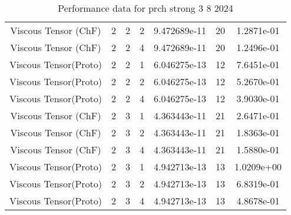 \documentclass{article}
\begin{document}
\begin{small}
\begin{table}
\begin{center}
\begin{tabular}{|c|c|c|c|c|c||c|}
        Viscous Tensor  (ChF) & 2 & 2 & 2& 9.472689e-11 & 20 & 1.2871e-01\\
        Viscous Tensor  (ChF) & 2 & 2 & 4& 9.472689e-11 & 20 & 1.2496e-01\\
        Viscous Tensor(Proto) & 2 & 2 & 1& 6.046275e-13 & 12 & 7.6451e-01\\
        Viscous Tensor(Proto) & 2 & 2 & 2& 6.046275e-13 & 12 & 5.2670e-01\\
        Viscous Tensor(Proto) & 2 & 2 & 4& 6.046275e-13 & 12 & 3.9030e-01\\
        \hline 
        Viscous Tensor  (ChF) & 2 & 3 & 1& 4.363443e-11 & 21 & 2.6471e-01\\
        Viscous Tensor  (ChF) & 2 & 3 & 2& 4.363443e-11 & 21 & 1.8363e-01\\
        Viscous Tensor  (ChF) & 2 & 3 & 4& 4.363443e-11 & 21 & 1.5880e-01\\
        Viscous Tensor(Proto) & 2 & 3 & 1& 4.942713e-13 & 13 & 1.0209e+00\\
        Viscous Tensor(Proto) & 2 & 3 & 2& 4.942713e-13 & 13 & 6.8319e-01\\
        Viscous Tensor(Proto) & 2 & 3 & 4& 4.942713e-13 & 13 & 4.8678e-01\\
        \hline 
      \end{tabular} 
    \end{center}   
    \caption{Performance data for  prch strong 3 8 2024} 
  \end{table} 
\end{small}
\end{document}
